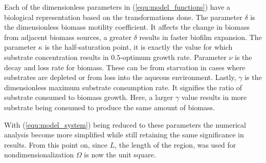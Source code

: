Each of the dimensionless parameters in (\ref{equ:model_functions}) have a biological representation based on the transformations done.
The parameter $\delta$ is the dimensionless biomass motility coefficient.
It affects the change in biomass from adjacent biomass sources, a greater $\delta$ results in faster biofilm expansion.
The parameter $\kappa$ is the half-saturation point, it is exactly the value for which substrate concentration results in $0.5$-optimum growth rate.
Parameter $\nu$ is the decay and loss rate for biomass.
These can be from starvation in cases where substrates are depleted or from loss into the aqueous environment.
Lastly, $\gamma$ is the dimensionless maximum substrate consumption rate.
It signifies the ratio of substrate consumed to biomass growth.
Here, a larger $\gamma$ value results in more substrate being consumed to  produce the same amount of biomass. 

With (\ref{equ:model_system}) being reduced to these parameters the numerical analysis become more simplified while still retaining the same significance in results.
From this point on, since $L$, the length of the region, was used for nondimensionalization $\Omega$ is now the unit square.
